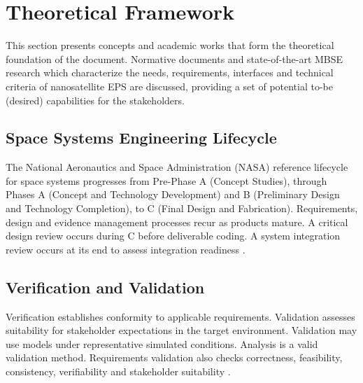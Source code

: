\chapter{Theoretical Framework}
\label{ch:marco}
This section presents concepts and academic works that form the theoretical foundation of the document.
Normative documents and state-of-the-art MBSE research which characterize the needs, requirements, interfaces and technical criteria of nanosatellite EPS are discussed, providing a set of potential to-be (desired) capabilities for the stakeholders.

\section{Space Systems Engineering Lifecycle}
The National Aeronautics and Space Administration (NASA) reference lifecycle for space systems progresses from Pre-Phase A (Concept Studies), through Phases A (Concept and Technology Development) and B (Preliminary Design and Technology Completion), to C (Final Design and Fabrication). Requirements, design and evidence management processes recur as products mature. A critical design review occurs during C before deliverable coding. A system integration review occurs at its end to assess integration readiness \citep[Secs.~2.2--2.3, 3.3--3.6 and Table~6.7-1]{nasa2016systems}.

\section{Verification and Validation}
Verification establishes conformity to applicable requirements. Validation assesses suitability for stakeholder expectations in the target environment. Validation may use models under representative simulated conditions. Analysis is a valid validation method. Requirements validation also checks correctness, feasibility, consistency, verifiability and stakeholder suitability \citep[Secs.~2.4, 4.2 and~5.3--5.4]{nasa2016systems}\citep[pp.~7--9]{handpicked-0001}.

